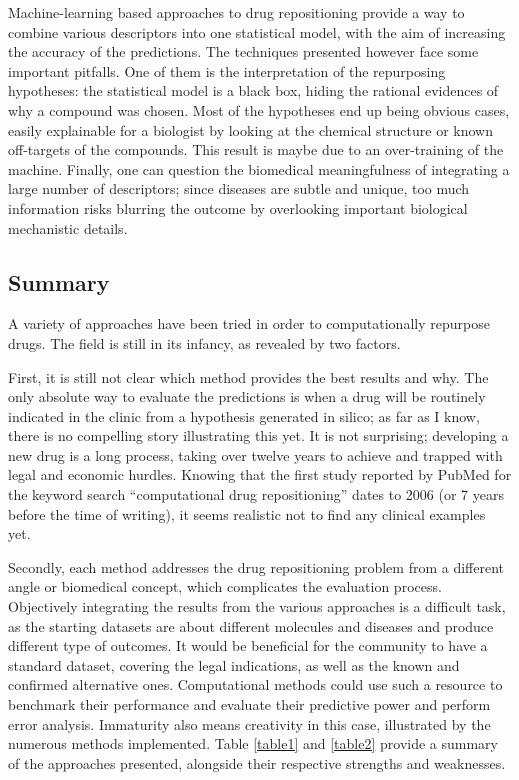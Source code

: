 Machine-learning based approaches to drug repositioning provide a way to combine various descriptors into one statistical model, with the aim of increasing the accuracy of the predictions. The techniques presented however face some important pitfalls. One of them is the interpretation of the repurposing hypotheses: the statistical model is a black box, hiding the rational evidences of why a compound was chosen. Most of the hypotheses end up being obvious cases, easily explainable for a biologist by looking at the chemical structure or known off-targets of the compounds. This result is maybe due to an over-training of the machine. Finally, one can question the biomedical meaningfulness of integrating a large number of descriptors; since diseases are subtle and unique, too much information risks blurring the outcome by overlooking important biological mechanistic details.

\subsection{Summary}

A variety of approaches have been tried in order to computationally repurpose drugs. The field is still in its infancy, as revealed by two factors.

First, it is still not clear which method provides the best results and why. The only absolute way to evaluate the predictions is when a drug will be routinely indicated in the clinic from a hypothesis generated in silico; as far as I know, there is no compelling story illustrating this yet. It is not surprising; developing a new drug is a long process, taking over twelve years to achieve and trapped with legal and economic hurdles. Knowing that the first study reported by PubMed for the keyword search “computational drug repositioning” dates to 2006 \citep{an2006large} (or 7 years before the time of writing), it seems realistic not to find any clinical examples yet.

Secondly, each method addresses the drug repositioning problem from a different angle or biomedical concept, which complicates the evaluation process. Objectively integrating the results from the various approaches is a difficult task, as the starting datasets are about different molecules and diseases and produce different type of outcomes. It would be beneficial for the community to have a standard dataset, covering the legal indications, as well as the known and confirmed alternative ones. Computational methods could use such a resource to benchmark their performance and evaluate their predictive power and perform error analysis.
Immaturity also means creativity in this case, illustrated by the numerous methods implemented. Table \ref{table1} and \ref{table2} provide a summary of the approaches presented, alongside their respective strengths and weaknesses.

